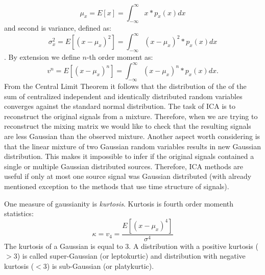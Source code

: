 \documentclass{article}
\begin{document}
\begin{equation}
\mu_x = E\left[x\right] = \int_{-\infty}^\infty x * p_x(x) dx
\end{equation}
and second is variance, defined as:
\label{1ord}
\begin{equation}
\sigma_x^2 = E\left[(x-\mu_x)^2\right] = \int_{-\infty}^\infty (x-\mu_x)^2 * p_x(x) dx
\label{2ord}
\end{equation}.
By extension we define $n$-th order moment as:
\label{nord}
\begin{equation}
v^n = E\left[(x-\mu_x)^n\right] = \int_{-\infty}^\infty (x-\mu_x)^n * p_x(x) dx.
\end{equation}
From the Central Limit Theorem it follows that the distribution of the of the sum of  centralized independent and identically distributed  random variables converges against the standard normal distribution. The task of ICA is to reconstruct the original signals from a mixture. Therefore, when we are trying to reconstruct the mixing matrix we would like to check that the resulting signals are less Gaussian than the observed mixture.
Another aspect worth considering is that the linear mixture of two Gaussian random variables results in new Gaussian distribution. This makes it impossible to infer if the original signals contained a single or multiple Gaussian distributed sources. Therefore, ICA methods are useful if only at most one source signal was Gaussian distributed (with already mentioned exception to the methods that use time structure of signals).

One measure of gaussianity is \textit{kurtosis}. Kurtosis is fourth order momenth statistics:
\begin{equation}
    \kappa = v_4 = \frac{E\left[(x-\mu_x)^4\right] }{\sigma^4}
\end{equation}
The kurtosis of a Gaussian is equal to 3. A distribution with a positive kurtosis ($>3$) is called super-Gaussian (or leptokurtic) and distribution with negative kurtosis ($<3$) is sub-Gaussian (or platykurtic).
\end{document}
